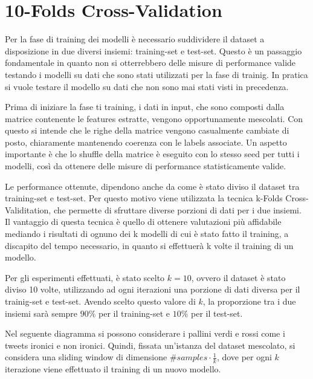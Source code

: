 \documentclass[oneside]{book}
\begin{document}
\section{10-Folds Cross-Validation}
Per la fase di training dei modelli è necessario suddividere il dataset a disposizione in due diversi insiemi: training-set e test-set. Questo è un passaggio fondamentale in quanto non si otterrebbero delle misure di performance valide testando i modelli su dati che sono stati utilizzati per la fase di trainig. In pratica si vuole testare il modello su dati che non sono mai stati visti in precedenza.

Prima di iniziare la fase ti training, i dati in input, che sono composti dalla matrice contenente le features estratte, vengono opportunamente mescolati. Con questo si intende che le righe della matrice vengono casualmente cambiate di posto, chiaramente mantenendo coerenza con le labels associate. Un aspetto importante è che lo shuffle della matrice è eseguito con lo stesso seed per tutti i modelli, così da ottenere delle misure di performance statisticamente valide.

Le performance ottenute, dipendono anche da come è stato diviso il dataset tra training-set e test-set. Per questo motivo viene utilizzata la tecnica k-Folds Cross-Validitation, che permette di sfruttare diverse porzioni di dati per i due insiemi. Il vantaggio di questa tecnica è quello di ottenere valutazioni più affidabile mediando i risultati di ognuno dei k modelli di cui è stato fatto il training, a discapito del tempo necessario, in quanto si effettuerà k volte il training di un modello.

Per gli esperimenti effettuati, è stato scelto $k=10$, ovvero il dataset è stato diviso 10 volte, utilizzando ad ogni iterazioni una porzione di dati diversa per il trainig-set e test-set. Avendo scelto questo valore di $k$, la proporzione tra i due insiemi sarà sempre $90\%$ per il training-set e $10\%$ per il test-set.

Nel seguente diagramma si possono considerare i pallini verdi e rossi come i tweets ironici e non ironici. Quindi, fissata un'istanza del dataset mescolato, si considera una sliding window di dimensione $\#samples \cdot \frac{1}{k}$, dove per ogni $k$ iterazione viene effettuato il training di un nuovo modello.
\end{document}
